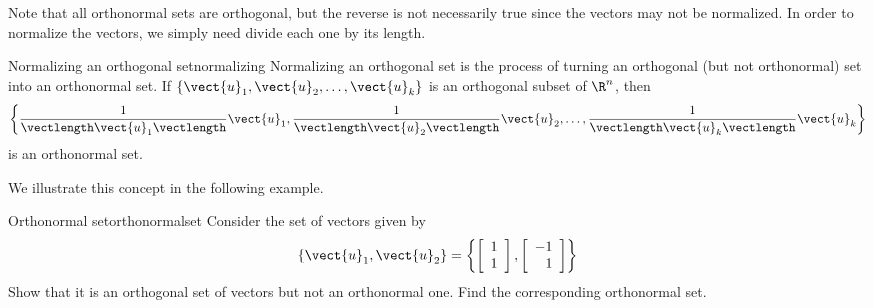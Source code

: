 Note that all orthonormal sets are orthogonal, but the reverse is not
necessarily true since the vectors may not be normalized. In order to
normalize the vectors, we simply need divide each one by its length.

\begin{definition}{Normalizing an orthogonal set}{normalizing}
Normalizing an orthogonal set is the process of 
turning an orthogonal (but not orthonormal) set into
an orthonormal set.
If $\{ \vect{u}_1, \vect{u}_2, \ldots, \vect{u}_k\}$
is an orthogonal subset of $\R^n$, 
then 
\[ \left\{
\frac{1}{\vectlength\vect{u}_1\vectlength}\vect{u}_1,
\frac{1}{\vectlength\vect{u}_2\vectlength}\vect{u}_2, \ldots,
\frac{1}{\vectlength\vect{u}_k\vectlength}\vect{u}_k \right\}
\]
is an orthonormal set.
\end{definition}

We illustrate this concept in the following example. 

\begin{example}{Orthonormal set}{orthonormalset}
Consider the set of vectors  given by 
\[
\left\{ \vect{u}_1, \vect{u}_2 \right\} = \left\{
\left[
\begin{array}{c}
1 \\
1 
\end{array}
\right], 
\left[
\begin{array}{r}
-1 \\
1
\end{array}
\right]
\right\}
\]
Show that it is an orthogonal set of vectors  but not an orthonormal one. Find the corresponding orthonormal set. 
\end{example}

